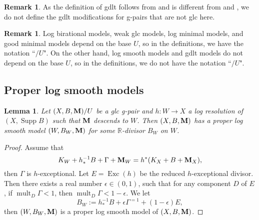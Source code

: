 \documentclass[11pt]{amsart}
\numberwithin{equation}{section}
\newcommand{\Mm}{{\bf{M}}}
\newcommand{\Rr}{\mathbb{R}}
\newcommand{\Exc}{\operatorname{Exc}}
\newcommand{\Supp}{\operatorname{Supp}}
\newcommand{\mult}{\operatorname{mult}}
\newtheorem{lem}[thm]{Lemma}
\theoremstyle{definition}
\theoremstyle{definition}
\newtheorem{rem}[thm]{Remark}
\theoremstyle{definition}
\begin{document}
\begin{rem}
As the definition of gdlt follows from \cite{HL18} and is different from \cite{Bir20a} and \cite{FS20b}, we do not define the gdlt modifications for g-pairs that are not glc here.
\end{rem}

\begin{rem}
Log birational models, weak glc models, log minimal models, and good minimal models depend on the base $U$, so in the definitions, we have the notation ``$/U$". On the other hand, log smooth models and gdlt models do not depend on the base $U$, so in the definitions, we do not have the notation ``$/U$". 
\end{rem}


\subsection{Proper log smooth models}

\begin{lem}\label{lem: existence of proper log smooth model}
Let $(X,B,\Mm)/U$ be a glc g-pair and $h: W\rightarrow X$ a log resolution of $(X,\Supp B)$ such that $\Mm$ descends to $W$. Then $(X,B,\Mm)$ has a proper log smooth model $(W,B_W,\Mm)$ for some $\Rr$-divisor $B_W$ on $W$.
\end{lem}
\begin{proof}
Assume that
$$K_W+h^{-1}_*B+\Gamma+\Mm_W=h^*(K_X+B+\Mm_X),$$
then $\Gamma$ is $h$-exceptional. Let $E=\Exc(h)$ be the reduced $h$-exceptional divisor. Then there exists a real number $\epsilon\in (0,1)$, such that for any component $D$ of $E$, if $\mult_D\Gamma<1$, then $\mult_D\Gamma<1-\epsilon$. We let $$B_W:=h^{-1}_*B+\epsilon\Gamma^{=1}+(1-\epsilon)E,$$
then $(W,B_W,\Mm)$ is a proper log smooth model of $(X,B,\Mm)$.
\end{proof}
\end{document}
